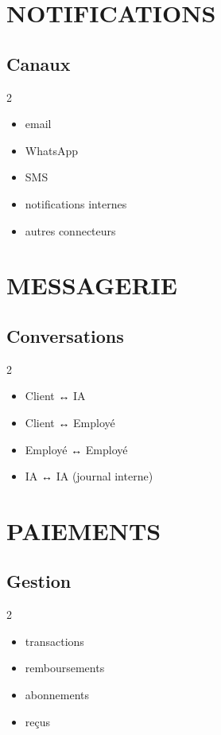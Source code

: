 \documentclass[12pt,a4paper,oneside]{book}
\begin{document}
\chapter{NOTIFICATIONS}

\section{Canaux}
\begin{multicols}{2}
\begin{itemize}
\item email
\item WhatsApp
\item SMS
\item notifications internes
\item autres connecteurs
\end{itemize}
\end{multicols}

\chapter{MESSAGERIE}

\section{Conversations}
\begin{multicols}{2}
\begin{itemize}
\item Client ↔ IA
\item Client ↔ Employé
\item Employé ↔ Employé
\item IA ↔ IA (journal interne)
\end{itemize}
\end{multicols}

\chapter{PAIEMENTS}

\section{Gestion}
\begin{multicols}{2}
\begin{itemize}
\item transactions
\item remboursements
\item abonnements
\item reçus
\end{itemize}
\end{multicols}
\end{document}
